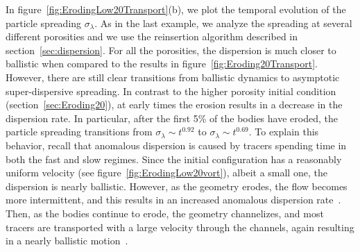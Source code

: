 \documentclass{jfm}
\begin{document}
In figure~\ref{fig:ErodingLow20Transport}(b), we plot the temporal
evolution of the particle spreading $\sigma_\lambda$.  As in the last
example, we analyze the spreading at several different porosities and we
use the reinsertion algorithm described in section~\ref{sec:dispersion}.
For all the porosities, the dispersion is much closer to ballistic when
compared to the results in figure~\ref{fig:Eroding20Transport}.
However, there are still clear transitions from ballistic dynamics to
asymptotic super-dispersive spreading.  In contrast to the higher
porosity initial condition (section~\ref{sec:Eroding20}), at early times
the erosion results in a decrease in the dispersion rate. In particular,
after the first 5\% of the bodies have eroded, the particle spreading
transitions from $\sigma_\lambda \sim t^{0.92}$ to $\sigma_\lambda \sim
t^{0.69}$.  To explain this behavior, recall that anomalous dispersion
is caused by tracers spending time in both the fast and slow regimes.
Since the initial configuration has a reasonably uniform velocity (see
figure~\ref{fig:ErodingLow20vort}), albeit a small one, the dispersion
is nearly ballistic. However, as the geometry erodes, the flow becomes
more intermittent, and this results in an increased anomalous dispersion
rate~\citep{dea-leb-den-tar-bol-dav2013}.  Then, as the bodies continue
to erode, the geometry channelizes, and most tracers are transported
with a large velocity through the channels, again resulting in a nearly
ballistic motion~\citep{sie-ili-pri-riv-gua2019}.

\end{document}
